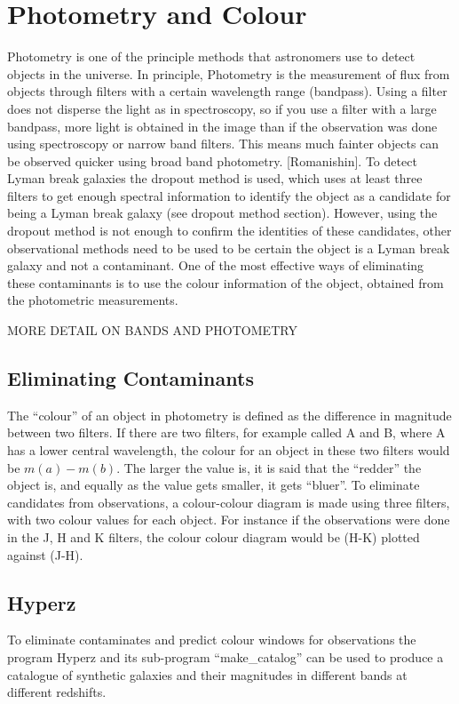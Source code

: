 
\section{Photometry and Colour} %
\label{sec:Photometry_Colour}
	Photometry is one of the principle methods that astronomers use to detect objects in the universe. In principle, Photometry is the measurement of flux from objects through filters with a certain wavelength range (bandpass). Using a filter does not disperse the light as in spectroscopy, so if you use a filter with a large bandpass, more light is obtained in the image than if the observation was done using spectroscopy or narrow band filters. This means much fainter objects can be observed quicker using broad band photometry. [Romanishin]. To detect Lyman break galaxies the dropout method is used, which uses at least three filters to get enough spectral information to identify the object as a candidate for being a Lyman break galaxy (see dropout method section). However,  using the dropout method is not enough to confirm the identities of these candidates, other observational methods need to be used to be certain the object is a Lyman break galaxy and not a contaminant. One of the most effective ways of eliminating these contaminants is to use the colour information of the object, obtained from the photometric measurements.

	MORE DETAIL ON BANDS AND PHOTOMETRY

    \subsection{Eliminating Contaminants} %
    \label{sub:Eliminating_Contanimants}
		The ``colour'' of an object in photometry is defined as the difference in magnitude between two filters. If there are two filters, for example called A and B, where A has a lower central wavelength, the colour for an object in these two filters would be $m(a)-m(b)$. The larger the value is, it is said that the ``redder'' the object is, and equally as the value gets smaller, it gets ``bluer''. To eliminate candidates from observations, a colour-colour diagram is made using three filters, with two colour values for each object. For instance if the observations were done in the J, H and K filters, the colour colour diagram would be (H-K) plotted against (J-H).

    \subsection{Hyperz} %
	\label{sub:Hyperz}
		To eliminate contaminates and predict colour windows for observations the program Hyperz and its sub-program ``make\_catalog'' can be used to produce a catalogue of synthetic galaxies and their magnitudes in different bands at different redshifts.

